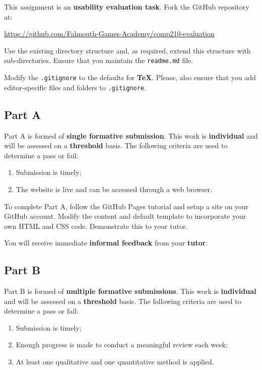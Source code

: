 \documentclass{../fal_assignment}
\begin{document}
This assignment is an \textbf{usability evaluation task}. Fork the GitHub repository at:

\indent \url{https://github.com/Falmouth-Games-Academy/comp210-evaluation}

Use the existing directory structure and, as required, extend this structure with sub-directories. Ensure that you maintain the \texttt{readme.md} file.

Modify the \texttt{.gitignore} to the defaults for \textbf{TeX}. Please, also ensure that you add editor-specific files and folders to \texttt{.gitignore}. 

\subsection*{Part A}

Part A is formed of \textbf{single formative submission}. This work is \textbf{individual} and will be assessed on a \textbf{threshold} basis. The following criteria are used to determine a pass or fail:

\begin{enumerate}[label=(\alph*)]
	\item Submission is timely;
	\item The website is live and can be accessed through a web browser.
\end{enumerate}

To complete Part A, follow the GitHub Pages tutorial and setup a site on your GitHub account.  Modify the content and default template to incorporate your own HTML and CSS code. Demonstrate this to your tutor.

You will receive immediate \textbf{informal feedback} from your \textbf{tutor}.

\subsection*{Part B}

Part B is formed of \textbf{multiple formative submissions}. This work is \textbf{individual} and will be assessed on a \textbf{threshold} basis. The following criteria are used to determine a pass or fail:

\begin{enumerate}[label=(\alph*)]
	\item Submission is timely;
	\item Enough progress is made to conduct a meaningful review each week;
	\item At least one qualitative and one quantitative method is applied.
\end{enumerate}
\end{document}
